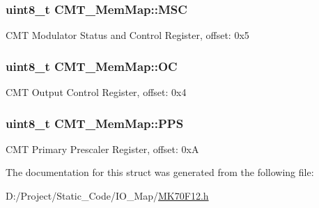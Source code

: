 \subsubsection[{M\+S\+C}]{\setlength{\rightskip}{0pt plus 5cm}uint8\+\_\+t C\+M\+T\+\_\+\+Mem\+Map\+::\+M\+S\+C}\label{struct_c_m_t___mem_map_ad1905c6966e1ac635348ce19d5c44ae9}
C\+M\+T Modulator Status and Control Register, offset\+: 0x5 \hypertarget{struct_c_m_t___mem_map_a67d3243d0c24b20b493fd919433dd84c}{}
\subsubsection[{O\+C}]{\setlength{\rightskip}{0pt plus 5cm}uint8\+\_\+t C\+M\+T\+\_\+\+Mem\+Map\+::\+O\+C}\label{struct_c_m_t___mem_map_a67d3243d0c24b20b493fd919433dd84c}
C\+M\+T Output Control Register, offset\+: 0x4 \hypertarget{struct_c_m_t___mem_map_a3a70b1ee9e4f0c56e0b2f48e059e1590}{}
\subsubsection[{P\+P\+S}]{\setlength{\rightskip}{0pt plus 5cm}uint8\+\_\+t C\+M\+T\+\_\+\+Mem\+Map\+::\+P\+P\+S}\label{struct_c_m_t___mem_map_a3a70b1ee9e4f0c56e0b2f48e059e1590}
C\+M\+T Primary Prescaler Register, offset\+: 0x\+A 

The documentation for this struct was generated from the following file\+:\begin{DoxyCompactItemize}
\item 
D\+:/\+Project/\+Static\+\_\+\+Code/\+I\+O\+\_\+\+Map/\hyperlink{_m_k70_f12_8h}{M\+K70\+F12.\+h}\end{DoxyCompactItemize}
